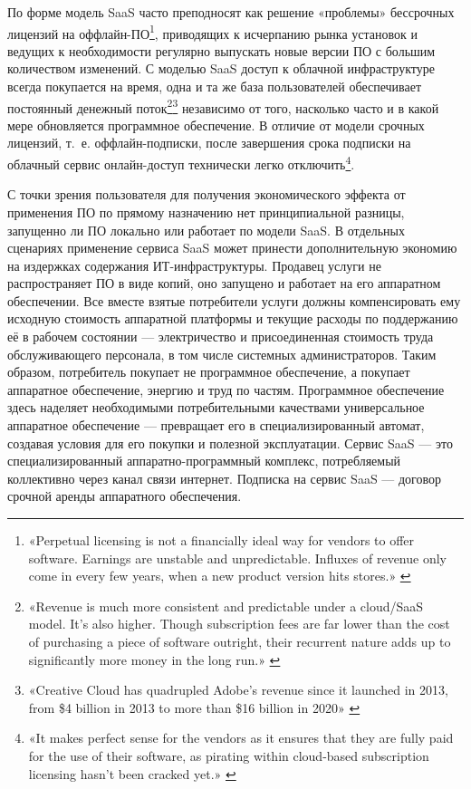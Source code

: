 \documentclass{article}
\begin{document}
По форме модель SaaS часто преподносят как решение «проблемы» бессрочных лицензий на оффлайн-ПО\footnote{«Perpetual licensing is not a financially ideal way for vendors to offer software. Earnings are unstable and unpredictable. Influxes of revenue only come in every few years, when a new product version hits stores.» \cite{saasVsPerpetualLicense}}, приводящих к исчерпанию рынка установок и ведущих к необходимости регулярно выпускать новые версии ПО с большим количеством изменений. С моделью SaaS доступ к облачной инфраструктуре всегда покупается на время, одна и та же база пользователей обеспечивает постоянный денежный поток\footnote{«Revenue is much more consistent and predictable under a cloud/SaaS model. It’s also higher. Though subscription fees are far lower than the cost of purchasing a piece of software outright, their recurrent nature adds up to significantly more money in the long run.» \cite{saasVsPerpetualLicense}}\footnote{«Creative Cloud has quadrupled Adobe's revenue since it launched in 2013, from \$4 billion in 2013 to more than \$16 billion in 2020» \cite{subscriptionProspere}} независимо от того, насколько часто и в какой мере обновляется программное обеспечение. В отличие от модели срочных лицензий, т.~е. оффлайн-подписки, после завершения срока подписки на облачный сервис онлайн-доступ технически легко отключить\footnote{«It makes perfect sense for the vendors as it ensures that they are fully paid for the use of their software, as pirating within cloud-based subscription licensing hasn’t been cracked yet.» \cite{microsoftMoveToSubscriptionAndSaas}}.

С точки зрения пользователя для получения экономического эффекта от применения ПО по прямому назначению нет принципиальной разницы, запущенно ли ПО локально или работает по модели SaaS. В отдельных сценариях применение сервиса SaaS может принести дополнительную экономию на издержках содержания ИТ-инфраструктуры. Продавец услуги не распространяет ПО в виде копий, оно запущено и работает на его аппаратном обеспечении. Все вместе взятые потребители услуги должны компенсировать ему исходную стоимость аппаратной платформы и текущие расходы по поддержанию её в рабочем состоянии — электричество и присоединенная стоимость труда обслуживающего персонала, в том числе системных администраторов. Таким образом, потребитель покупает не программное обеспечение, а покупает аппаратное обеспечение, энергию и труд по частям. Программное обеспечение здесь наделяет необходимыми потребительными качествами универсальное аппаратное обеспечение — превращает его в специализированный автомат, создавая условия для его покупки и полезной эксплуатации. Сервис SaaS — это специализированный аппаратно-программный комплекс, потребляемый коллективно через канал связи интернет. Подписка на сервис SaaS — договор срочной аренды аппаратного обеспечения. 
\end{document}
